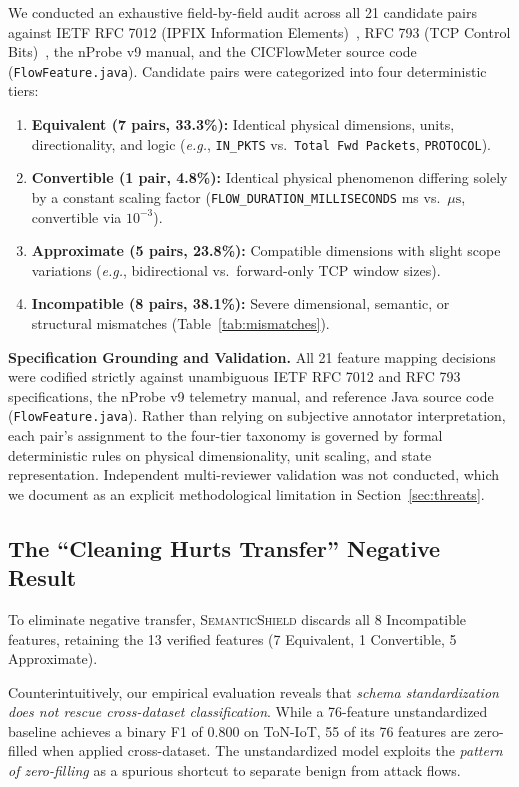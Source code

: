 \documentclass[journal]{IEEEtran}
\newcommand{\eg}{\emph{e.g.}}
\newcommand{\sysname}{\textsc{SemanticShield}}
\begin{document}
We conducted an exhaustive field-by-field audit across all 21 candidate pairs against IETF RFC 7012 (IPFIX Information Elements)~\cite{rfc7012}, RFC 793 (TCP Control Bits)~\cite{rfc793}, the nProbe v9 manual, and the CICFlowMeter source code (\texttt{FlowFeature.java}). Candidate pairs were categorized into four deterministic tiers:
\begin{enumerate}[leftmargin=*]
  \item \textbf{Equivalent (7 pairs, 33.3\%):} Identical physical dimensions, units, directionality, and logic (\eg, \texttt{IN\_PKTS} vs.\ \texttt{Total Fwd Packets}, \texttt{PROTOCOL}).
  \item \textbf{Convertible (1 pair, 4.8\%):} Identical physical phenomenon differing solely by a constant scaling factor (\texttt{FLOW\_DURATION\_MILLISECONDS} ms vs.\ $\mu\text{s}$, convertible via $10^{-3}$).
  \item \textbf{Approximate (5 pairs, 23.8\%):} Compatible dimensions with slight scope variations (\eg, bidirectional vs.\ forward-only TCP window sizes).
  \item \textbf{Incompatible (8 pairs, 38.1\%):} Severe dimensional, semantic, or structural mismatches (Table~\ref{tab:mismatches}).
\end{enumerate}

\textbf{Specification Grounding and Validation.} All 21 feature mapping decisions were codified strictly against unambiguous IETF RFC 7012 and RFC 793 specifications, the nProbe v9 telemetry manual, and reference Java source code (\texttt{FlowFeature.java}). Rather than relying on subjective annotator interpretation, each pair's assignment to the four-tier taxonomy is governed by formal deterministic rules on physical dimensionality, unit scaling, and state representation. Independent multi-reviewer validation was not conducted, which we document as an explicit methodological limitation in Section~\ref{sec:threats}.

\subsection{The ``Cleaning Hurts Transfer'' Negative Result}
To eliminate negative transfer, \sysname{} discards all 8 Incompatible features, retaining the 13 verified features (7 Equivalent, 1 Convertible, 5 Approximate). 

Counterintuitively, our empirical evaluation reveals that \emph{schema standardization does not rescue cross-dataset classification}. While a 76-feature unstandardized baseline achieves a binary F1 of 0.800 on ToN-IoT, 55 of its 76 features are zero-filled when applied cross-dataset. The unstandardized model exploits the \emph{pattern of zero-filling} as a spurious shortcut to separate benign from attack flows.
\end{document}
